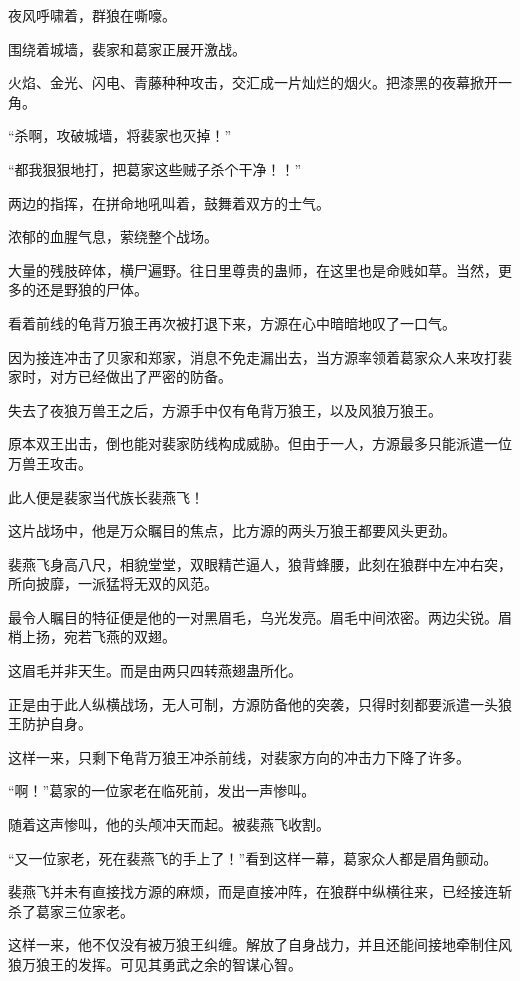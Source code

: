 
\begin{this_body}

夜风呼啸着，群狼在嘶嚎。

围绕着城墙，裴家和葛家正展开激战。

火焰、金光、闪电、青藤种种攻击，交汇成一片灿烂的烟火。把漆黑的夜幕掀开一角。

“杀啊，攻破城墙，将裴家也灭掉！”

“都我狠狠地打，把葛家这些贼子杀个干净！！”

两边的指挥，在拼命地吼叫着，鼓舞着双方的士气。

浓郁的血腥气息，萦绕整个战场。

大量的残肢碎体，横尸遍野。往日里尊贵的蛊师，在这里也是命贱如草。当然，更多的还是野狼的尸体。

看着前线的龟背万狼王再次被打退下来，方源在心中暗暗地叹了一口气。

因为接连冲击了贝家和郑家，消息不免走漏出去，当方源率领着葛家众人来攻打裴家时，对方已经做出了严密的防备。

失去了夜狼万兽王之后，方源手中仅有龟背万狼王，以及风狼万狼王。

原本双王出击，倒也能对裴家防线构成威胁。但由于一人，方源最多只能派遣一位万兽王攻击。

此人便是裴家当代族长裴燕飞！

这片战场中，他是万众瞩目的焦点，比方源的两头万狼王都要风头更劲。

裴燕飞身高八尺，相貌堂堂，双眼精芒逼人，狼背蜂腰，此刻在狼群中左冲右突，所向披靡，一派猛将无双的风范。

最令人瞩目的特征便是他的一对黑眉毛，乌光发亮。眉毛中间浓密。两边尖锐。眉梢上扬，宛若飞燕的双翅。

这眉毛并非天生。而是由两只四转燕翅蛊所化。

正是由于此人纵横战场，无人可制，方源防备他的突袭，只得时刻都要派遣一头狼王防护自身。

这样一来，只剩下龟背万狼王冲杀前线，对裴家方向的冲击力下降了许多。

“啊！”葛家的一位家老在临死前，发出一声惨叫。

随着这声惨叫，他的头颅冲天而起。被裴燕飞收割。

“又一位家老，死在裴燕飞的手上了！”看到这样一幕，葛家众人都是眉角颤动。

裴燕飞并未有直接找方源的麻烦，而是直接冲阵，在狼群中纵横往来，已经接连斩杀了葛家三位家老。

这样一来，他不仅没有被万狼王纠缠。解放了自身战力，并且还能间接地牵制住风狼万狼王的发挥。可见其勇武之余的智谋心智。


\end{this_body}
